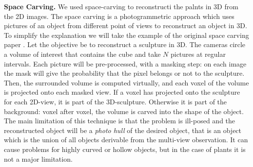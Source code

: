\textbf{Space Carving.}
We used space-carving to reconstructi the palnts in 3D from the 2D images. The space carving \cite{kutulakos_theory_1999} is a photogrammetric approach which uses pictures of an object from different point of views to reconstruct an object in 3D. To simplify the explanation we will take the example of the original space carving paper \cite{kutulakos_theory_1999}. Let the objective be to reconstruct a sculpture in 3D. The cameras circle a volume of interest that contains the cube and take $N$ pictures at regular intervals. Each picture will be pre-processed, with a masking step: on each image the mask will give the probability that the pixel belongs or not to the sculpture. Then, the surrounded volume is computed virtually, and each voxel of the volume is projected onto each masked view. If a voxel has projected onto the sculpture for each 2D-view, it is part of the 3D-sculpture. Otherwise it is part of the background: voxel after voxel, the volume is carved into the shape of the object. The main limitation of this technique is that the problem is ill-posed and the reconstructed object will be a \textit{photo hull} \cite{kutulakos_theory_1999} of the desired object, that is an object which is the union of all objects derivable from the multi-view observation. It can cause problems for highly curved or hollow objects, but in the case of plants it is not a major limitation. 

